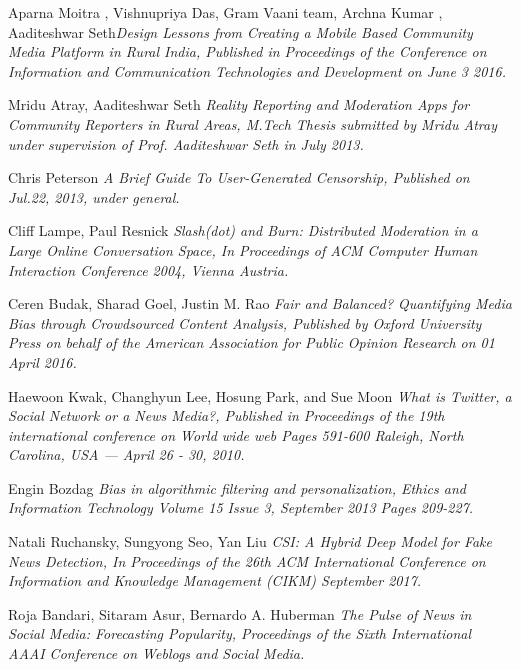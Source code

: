 \documentclass[11pt]{article}
\begin{document}
	\begin{thebibliography}{1}
	
    \bibitem{}
    
    {Aparna
Moitra , Vishnupriya Das, Gram Vaani team, Archna Kumar , Aaditeshwar Seth}\textit{Design Lessons from Creating a Mobile Based Community Media Platform in Rural India, Published in Proceedings of the Conference on Information
and Communication Technologies and Development on June 3 2016.}

    \bibitem{}
    {Mridu Atray, Aaditeshwar Seth}
    \textit{Reality Reporting and Moderation Apps for Community Reporters in Rural Areas, M.Tech Thesis submitted by Mridu Atray under supervision of Prof. Aaditeshwar Seth in July 2013.}
    
    \bibitem{}
    {Chris Peterson}
    \textit{A Brief Guide To User-Generated Censorship, Published on Jul.22, 2013, under general.}
    
    \bibitem{}
    {Cliff Lampe, Paul Resnick}
    \textit{Slash(dot) and Burn: Distributed Moderation in a Large Online Conversation Space, In Proceedings of ACM Computer Human Interaction Conference 2004, Vienna Austria.}

\bibitem{}
    {Ceren Budak,
Sharad Goel,
Justin M. Rao} \textit{ Fair and Balanced?
Quantifying Media Bias through
Crowdsourced Content Analysis, Published by Oxford University Press on behalf of the American Association for Public Opinion Research on 01 April 2016.}
    
    \bibitem{}
    Haewoon Kwak, Changhyun Lee, Hosung Park, and Sue Moon
    \textit{What is Twitter, a Social Network or a News Media?, Published in Proceedings of the 19th international conference on World wide web
Pages 591-600 Raleigh, North Carolina, USA — April 26 - 30, 2010. }
    
        \bibitem{}
    Engin Bozdag
    \textit{Bias in algorithmic filtering and personalization, Ethics and Information Technology Volume 15 Issue 3, September 2013 Pages 209-227.}

\bibitem{}
    Natali Ruchansky,
Sungyong Seo,
Yan Liu
    \textit{CSI: A Hybrid Deep Model for Fake News Detection, In Proceedings of the 26th ACM International Conference on Information and Knowledge Management (CIKM) September 2017.}

\bibitem{}
Roja Bandari,
Sitaram Asur,
Bernardo A. Huberman
    \textit{The Pulse of News in Social Media: Forecasting Popularity, Proceedings of the Sixth International AAAI Conference on Weblogs and Social Media.}
	\end{thebibliography}
\end{document}

